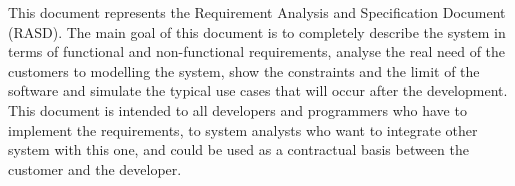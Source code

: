 This document represents the Requirement Analysis and Specification Document (RASD). The main goal of this document is to completely describe the system in terms of functional and non-functional requirements, analyse the real need of the customers to modelling the system, show the constraints and the limit of the software and simulate the typical use cases that will occur after the development. This document is intended to all developers and programmers who have to implement the requirements, to system analysts who want to integrate other system with this one, and could be used as a contractual basis between the customer and the developer.
